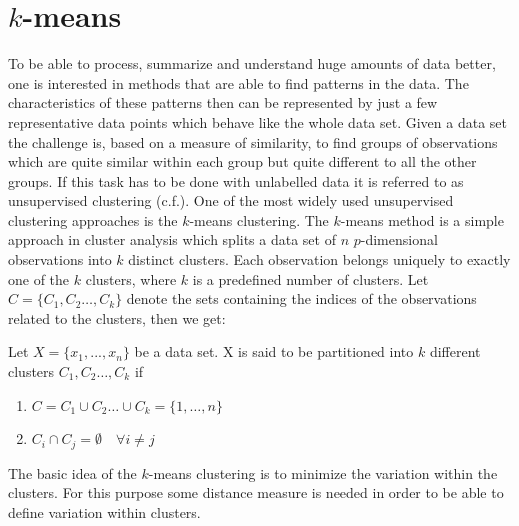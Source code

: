 

\chapter{$k$-means}
\label{cha:K-means}

To be able to process, summarize and understand huge amounts of data better, one is interested in methods that are able to find patterns in the data. The characteristics of these patterns then can be represented by just a few representative data points which behave like the whole data set. Given a  data set the challenge is, based on a measure of similarity, to find groups of observations which are quite similar within each group but quite different to all the other groups. If this task has to be done with unlabelled data it is referred to as unsupervised clustering (c.f.\cite{jain2010data}). One of the most widely used unsupervised clustering approaches is the $k$-means clustering. The $k$-means method is a simple approach in cluster analysis which splits a data set of $n$ $p$-dimensional observations into $k$ distinct clusters. Each observation belongs uniquely to exactly one of the $k$ clusters, where $k$ is a predefined number of clusters. Let $C=\{C_1, C_2 \dots, C_k\}$ denote the sets containing the indices of the observations  related to the clusters, then we get:
\begin{definition}
Let $X=\{x_1, ..., x_n\}$ be a data set. X is said to be partitioned into $k$ different clusters $C_1, C_2 \dots, C_k$ if
	\begin{enumerate}[label=(\roman*)] \centering
		\item $C = C_1 \cup C_2 \dots \cup C_k = \{1, \dots, n\}$

		\item $C_i \cap C_j = \emptyset \quad \forall i \neq j$
	\end{enumerate}
\end{definition}
The basic idea of the $k$-means clustering is to minimize the variation within the clusters. For this purpose some distance measure is needed in order to be able to define variation within clusters.
